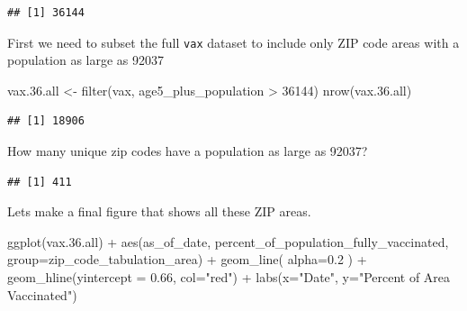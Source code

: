 \documentclass[
]{article}
\newenvironment{Shaded}{\begin{snugshade}}{\end{snugshade}}
\newcommand{\AttributeTok}[1]{\textcolor[rgb]{0.77,0.63,0.00}{#1}}
\newcommand{\DecValTok}[1]{\textcolor[rgb]{0.00,0.00,0.81}{#1}}
\newcommand{\FloatTok}[1]{\textcolor[rgb]{0.00,0.00,0.81}{#1}}
\newcommand{\FunctionTok}[1]{\textcolor[rgb]{0.00,0.00,0.00}{#1}}
\newcommand{\NormalTok}[1]{#1}
\newcommand{\OtherTok}[1]{\textcolor[rgb]{0.56,0.35,0.01}{#1}}
\newcommand{\SpecialCharTok}[1]{\textcolor[rgb]{0.00,0.00,0.00}{#1}}
\newcommand{\StringTok}[1]{\textcolor[rgb]{0.31,0.60,0.02}{#1}}
\begin{document}
\begin{verbatim}
## [1] 36144
\end{verbatim}

First we need to subset the full \texttt{vax} dataset to include only
ZIP code areas with a population as large as 92037

\begin{Shaded}
\begin{Highlighting}[]
\NormalTok{vax.}\FloatTok{36.}\NormalTok{all }\OtherTok{\textless{}{-}} \FunctionTok{filter}\NormalTok{(vax, age5\_plus\_population }\SpecialCharTok{\textgreater{}} \DecValTok{36144}\NormalTok{)}
\FunctionTok{nrow}\NormalTok{(vax.}\FloatTok{36.}\NormalTok{all)}
\end{Highlighting}
\end{Shaded}

\begin{verbatim}
## [1] 18906
\end{verbatim}

How many unique zip codes have a population as large as 92037?

\begin{Shaded}
\end{Shaded}

\begin{verbatim}
## [1] 411
\end{verbatim}

Lets make a final figure that shows all these ZIP areas.

\begin{Shaded}
\begin{Highlighting}[]
\FunctionTok{ggplot}\NormalTok{(vax.}\FloatTok{36.}\NormalTok{all) }\SpecialCharTok{+}
  \FunctionTok{aes}\NormalTok{(as\_of\_date, }
\NormalTok{      percent\_of\_population\_fully\_vaccinated,}
      \AttributeTok{group=}\NormalTok{zip\_code\_tabulation\_area) }\SpecialCharTok{+}
  \FunctionTok{geom\_line}\NormalTok{( }\AttributeTok{alpha=}\FloatTok{0.2}\NormalTok{ ) }\SpecialCharTok{+}
  \FunctionTok{geom\_hline}\NormalTok{(}\AttributeTok{yintercept =} \FloatTok{0.66}\NormalTok{, }\AttributeTok{col=}\StringTok{"red"}\NormalTok{) }\SpecialCharTok{+}
  \FunctionTok{labs}\NormalTok{(}\AttributeTok{x=}\StringTok{"Date"}\NormalTok{, }\AttributeTok{y=}\StringTok{"Percent of Area Vaccinated"}\NormalTok{)}
\end{Highlighting}
\end{Shaded}
\end{document}
